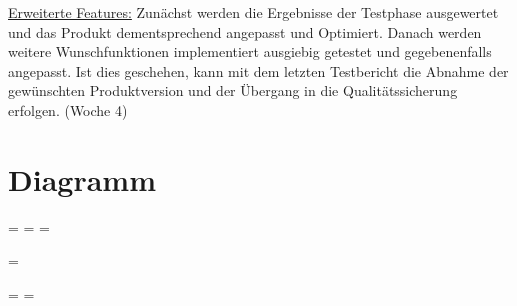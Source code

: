 \underline{Erweiterte Features:} Zunächst werden die Ergebnisse der Testphase ausgewertet und das Produkt dementsprechend angepasst und Optimiert. Danach werden weitere Wunschfunktionen implementiert ausgiebig getestet und gegebenenfalls angepasst. Ist dies geschehen, kann mit dem letzten Testbericht die Abnahme der gewünschten Produktversion und der Übergang in die Qualitätssicherung erfolgen. (Woche 4)



\section{Diagramm}

\newpage

\paperwidth=\pdfpageheight
{}\pdfpagewidth
\pdfpageheight=\paperheight
\pdfpagewidth=\paperwidth
{}\textheight

\begingroup 
\vsize=\textwidth
{}\textheight

\textwidth=\hsize
\textheight=\vsize

\rfoot{}


